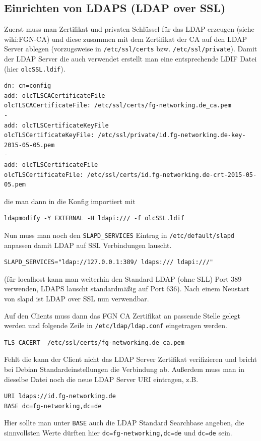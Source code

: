 \documentclass[11pt,a4paper,titlepage=firstiscover,headsepline,bibtotoc]{scrartcl} %
\begin{document}
\subsection{Einrichten von LDAPS (LDAP over SSL)}
Zuerst muss man Zertifikat und privaten Schlüssel für das LDAP erzeugen (siehe wiki:FGN-CA) und diese zusammen mit dem Zertifikat der CA auf den LDAP Server ablegen (vorzugsweise in \texttt{/etc/ssl/certs} bzw. \texttt{/etc/ssl/private}). Damit der LDAP Server die auch verwendet erstellt man eine entsprechende LDIF Datei (hier \texttt{olcSSL.ldif}).
\begin{lstlisting}
dn: cn=config
add: olcTLSCACertificateFile
olcTLSCACertificateFile: /etc/ssl/certs/fg-networking.de_ca.pem
-
add: olcTLSCertificateKeyFile
olcTLSCertificateKeyFile: /etc/ssl/private/id.fg-networking.de-key-2015-05-05.pem
-
add: olcTLSCertificateFile
olcTLSCertificateFile: /etc/ssl/certs/id.fg-networking.de-crt-2015-05-05.pem
\end{lstlisting}
die man dann in die Konfig importiert mit
\begin{lstlisting}
ldapmodify -Y EXTERNAL -H ldapi:/// -f olcSSL.ldif
\end{lstlisting}
Nun muss man noch den \texttt{SLAPD\_SERVICES} Eintrag in \texttt{/etc/default/slapd} anpassen damit LDAP auf SSL Verbindungen lauscht.
\begin{lstlisting}
SLAPD_SERVICES="ldap://127.0.0.1:389/ ldaps:/// ldapi:///"
\end{lstlisting}
(für localhost kann man weiterhin den Standard LDAP (ohne SLL) Port 389 verwenden, LDAPS lauscht standardmäßig auf Port 636). Nach einem Neustart von slapd ist LDAP over SSL nun verwendbar.

Auf den Clients muss dann das FGN CA Zertifikat an passende Stelle gelegt werden und folgende Zeile in \texttt{/etc/ldap/ldap.conf} eingetragen werden.
\begin{lstlisting}
TLS_CACERT  /etc/ssl/certs/fg-networking.de_ca.pem
\end{lstlisting}
Fehlt die kann der Client nicht das LDAP Server Zertifikat verifizieren und bricht bei Debian Standardeinstellungen die Verbindung ab. Außerdem muss man in dieselbe Datei noch die neue LDAP Server URI eintragen, z.B.
\begin{lstlisting}
URI ldaps://id.fg-networking.de
BASE dc=fg-networking,dc=de
\end{lstlisting}
Hier sollte man unter \texttt{BASE} auch die LDAP Standard Searchbase angeben, die sinnvollsten Werte dürften hier \texttt{dc=fg-networking,dc=de} und \texttt{dc=de} sein.
\end{document}
